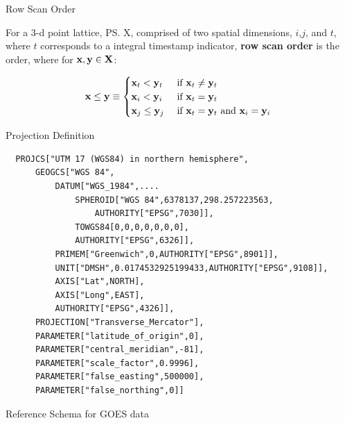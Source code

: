 \documentclass[final,total,bgColor,slideColor,pdf,ps2pdf,default,noaccumulate]{prosper}
\begin{document}
\begin{slide}{Row Scan Order}

  For a 3-d point lattice, \ps{X}, comprised of two spatial
  dimensions, $i$,$j$, and $t$, where $t$ corresponds to a integral
  timestamp indicator, {\bf row scan order} is the order, where for
  ${\bf{x}},{\bf{y}} \in {\ensuremath{\bf{X}}}$:

  \begin{gather*}
    {\ensuremath{\bf{x}}} \le {\ensuremath{\bf{y}}} \equiv
    \begin{cases}
      {\ensuremath{\bf{x}}}_t < {\bf{y}}_t & \text{ if ${\bf{x}}_t \ne {\ensuremath{\bf{y}}}_t$ }\\
      {\bf{x}}_i < {\bf{y}}_i & \text{ if ${\bf{x}}_t = {\bf{y}}_t$ }  \\
      {\bf{x}}_j \le {\ensuremath{\bf{y}}}_j & \text{ if ${\bf{x}}_t = {\bf{y}}_t$ and
        ${\bf{x}}_i = {\bf{y}}_i$ }
    \end{cases} 
  \end{gather*}
\end{slide}
\begin{slide}{Projection Definition}
  \centering
  { \fontsize{8}{8}\selectfont
\begin{verbatim}
  PROJCS["UTM 17 (WGS84) in northern hemisphere",
      GEOGCS["WGS 84",
          DATUM["WGS_1984",....
              SPHEROID["WGS 84",6378137,298.257223563,
                  AUTHORITY["EPSG",7030]],
              TOWGS84[0,0,0,0,0,0,0],
              AUTHORITY["EPSG",6326]],
          PRIMEM["Greenwich",0,AUTHORITY["EPSG",8901]],
          UNIT["DMSH",0.0174532925199433,AUTHORITY["EPSG",9108]],
          AXIS["Lat",NORTH],
          AXIS["Long",EAST],
          AUTHORITY["EPSG",4326]],
      PROJECTION["Transverse_Mercator"],
      PARAMETER["latitude_of_origin",0],
      PARAMETER["central_meridian",-81],
      PARAMETER["scale_factor",0.9996],
      PARAMETER["false_easting",500000],
      PARAMETER["false_northing",0]]
\end{verbatim}
}
\end{slide}

\begin{slide}{Reference Schema for GOES data}
  \begin{center}
    \scalebox{0.7}{}
  \end{center}
\end{slide}
\end{document}
